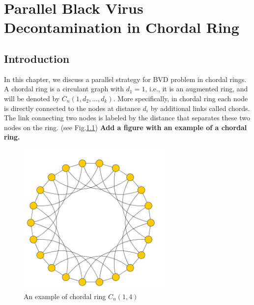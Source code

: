 


\chapter {Parallel Black Virus Decontamination in Chordal Ring}
\label{TL}
 

\section{Introduction}
In this chapter, we discuss a parallel strategy for  BVD problem in chordal rings. A chordal ring is a circulant graph with $d_1=1$, i.e., it is an augmented ring, and will be denoted by $C_n(1, d_2, ..., d_k)$. More specifically, in chordal ring each node is directly connected to the nodes at distance $d_i$ by additional links called chords. The link connecting two nodes is labeled by the distance that separates these two nodes on the ring. (see Fig.\ref{fig:chordalring})
{\bf Add a figure with an example of a chordal ring.}
\begin{figure}[H]
  \centering  
  \includegraphics[width=3in]{figures/chordalring.png}
  \caption{An example of chordal ring $C_n(1,4)$}\label{fig:chordalring}
\end{figure}

